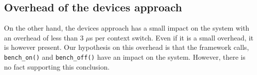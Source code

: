 \subsection{Overhead of the devices approach}

On the other hand, the devices approach has a small impact on the system with an overhead of less than 3 $\mu$s per context switch.
Even if it is a small overhead, it is however present.
Our hypothesis on this overhead is that the framework calls, \texttt{bench\_on()} and \texttt{bench\_off()} have an impact on the system.
However, there is no fact supporting this conclusion.